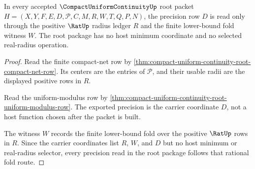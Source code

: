 \begin{theorem}
\label{thm:compact-uniform-continuity-root-rational-fold-route}
In every accepted $\CompactUniformContinuityUp$ root packet
$H=(X,Y,F,E,D,\mathcal{P},C,M,R,W,T,Q,P,N)$, the precision row $D$ is read only through the positive $\RatUp$ radius ledger $R$ and the finite lower-bound fold witness $W$. The root package has no host minimum coordinate and no selected real-radius operation.
\end{theorem}
\begin{proof}
Read the finite compact-net row by \autoref{thm:compact-uniform-continuity-root-compact-net-row}. Its centers are the entries of $\mathcal{P}$, and their usable radii are the displayed positive rows in $R$.

Read the uniform-modulus row by \autoref{thm:compact-uniform-continuity-root-uniform-modulus-row}. The exported precision is the carrier coordinate $D$, not a host function chosen after the packet is built.

The witness $W$ records the finite lower-bound fold over the positive $\RatUp$ rows in $R$. Since the carrier coordinates list $R$, $W$, and $D$ but no host minimum or real-radius selector, every precision read in the root package follows that rational fold route.
\end{proof}

